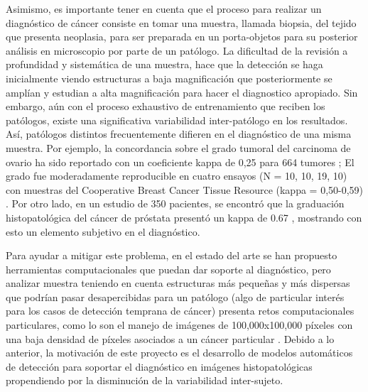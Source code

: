 \documentclass[12pt,letterpaper,final, openany]{scrbook}
\begin{document}
Asimismo, es importante tener en cuenta que el proceso para realizar un diagnóstico de cáncer consiste en tomar una muestra, llamada biopsia, del tejido que presenta neoplasia, para ser preparada en un porta-objetos para su posterior análisis en microscopio por parte de un patólogo. La dificultad de la revisión a profundidad y sistemática de una muestra, hace que la detección se haga inicialmente viendo estructuras a baja magnificación que posteriormente se amplían y estudian a alta magnificación para hacer el diagnostico apropiado. Sin embargo, aún con el proceso exhaustivo de entrenamiento que reciben los patólogos, existe una significativa variabilidad inter-patólogo en los
resultados. Así, patólogos distintos frecuentemente difieren en el diagnóstico de una misma muestra. Por ejemplo, la concordancia sobre el grado tumoral del carcinoma de ovario ha sido reportado con un coeficiente kappa de 0,25 para 664 tumores \cite{matsuno_agreement_2013}; El grado fue moderadamente reproducible en cuatro ensayos (N = 10, 10, 19, 10) con muestras del Cooperative Breast Cancer Tissue Resource (kappa = 0,50-0,59) \cite{meyer_breast_2005}. Por otro lado, en un estudio de 350 pacientes, se encontró que la graduación  histopatológica del cáncer de próstata presentó un kappa de 0.67 \cite{noauthor_prostate_nodate}, mostrando con esto un elemento subjetivo en el diagnóstico.

Para ayudar a mitigar este problema, en el estado del arte se han propuesto herramientas computacionales que puedan dar soporte al diagnóstico, pero analizar muestra teniendo en cuenta estructuras más pequeñas y más dispersas que podrían pasar desapercibidas para un patólogo (algo de particular interés para los casos de detección temprana de cáncer) presenta retos computacionales particulares, como lo son el manejo de imágenes de 100,000x100,000 píxeles con una baja densidad de píxeles asociados a un cáncer particular \cite{niazi_digital_2019} \cite{wang_managing_2012}. Debido a lo anterior, la motivación de este proyecto es el desarrollo de modelos automáticos de detección para soportar el diagnóstico en imágenes histopatológicas propendiendo por la disminución de la variabilidad inter-sujeto.
\end{document}
